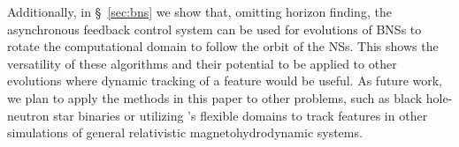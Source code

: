 \begin{bibunit}[unsrtnat]
Additionally, in \S~\ref{sec:bns} we show that, omitting horizon finding,
the asynchronous feedback control system can be used for evolutions of BNSs to
rotate the computational domain to follow the orbit of the NSs. This shows the
versatility of these algorithms and their potential to be applied to other
evolutions where dynamic tracking of a feature would be useful. As future work,
we plan to apply the methods in this paper to other problems, such as black
hole-neutron star binaries or utilizing \spectre's flexible domains to track
features in other simulations of general relativistic magnetohydrodynamic
systems.



\ack


\end{bibunit}
